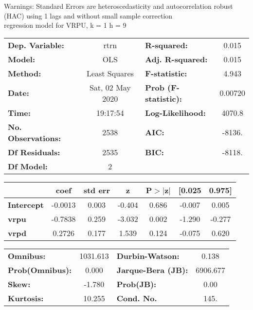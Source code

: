 Warnings: \newline
 [1] Standard Errors are heteroscedasticity and autocorrelation robust (HAC) using 1 lags and without small sample correction\\ 

regression model for VRPU, k = 1 h = 9\begin{center}
\begin{tabular}{lclc}
\toprule
\textbf{Dep. Variable:}    &       rtrn       & \textbf{  R-squared:         } &     0.015   \\
\textbf{Model:}            &       OLS        & \textbf{  Adj. R-squared:    } &     0.015   \\
\textbf{Method:}           &  Least Squares   & \textbf{  F-statistic:       } &     4.943   \\
\textbf{Date:}             & Sat, 02 May 2020 & \textbf{  Prob (F-statistic):} &  0.00720    \\
\textbf{Time:}             &     19:17:54     & \textbf{  Log-Likelihood:    } &    4070.8   \\
\textbf{No. Observations:} &        2538      & \textbf{  AIC:               } &    -8136.   \\
\textbf{Df Residuals:}     &        2535      & \textbf{  BIC:               } &    -8118.   \\
\textbf{Df Model:}         &           2      & \textbf{                     } &             \\
\bottomrule
\end{tabular}
\begin{tabular}{lcccccc}
                   & \textbf{coef} & \textbf{std err} & \textbf{z} & \textbf{P$> |$z$|$} & \textbf{[0.025} & \textbf{0.975]}  \\
\midrule
\textbf{Intercept} &      -0.0013  &        0.003     &    -0.404  &         0.686        &       -0.007    &        0.005     \\
\textbf{vrpu}      &      -0.7838  &        0.259     &    -3.032  &         0.002        &       -1.290    &       -0.277     \\
\textbf{vrpd}      &       0.2726  &        0.177     &     1.539  &         0.124        &       -0.075    &        0.620     \\
\bottomrule
\end{tabular}
\begin{tabular}{lclc}
\textbf{Omnibus:}       & 1031.613 & \textbf{  Durbin-Watson:     } &    0.138  \\
\textbf{Prob(Omnibus):} &   0.000  & \textbf{  Jarque-Bera (JB):  } & 6906.677  \\
\textbf{Skew:}          &  -1.780  & \textbf{  Prob(JB):          } &     0.00  \\
\textbf{Kurtosis:}      &  10.255  & \textbf{  Cond. No.          } &     145.  \\
\bottomrule
\end{tabular}
\end{center}

